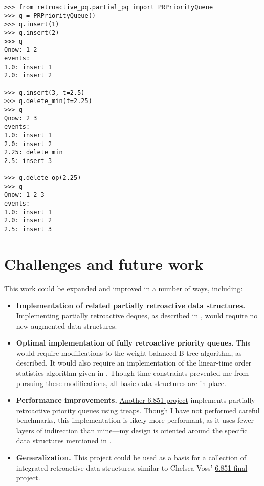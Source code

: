 \documentclass{article}
\begin{document}
\begin{verbatim}
>>> from retroactive_pq.partial_pq import PRPriorityQueue
>>> q = PRPriorityQueue()
>>> q.insert(1)
>>> q.insert(2)
>>> q
Qnow: 1 2
events:
1.0: insert 1
2.0: insert 2

>>> q.insert(3, t=2.5)
>>> q.delete_min(t=2.25)
>>> q
Qnow: 2 3
events:
1.0: insert 1
2.0: insert 2
2.25: delete min
2.5: insert 3

>>> q.delete_op(2.25)
>>> q
Qnow: 1 2 3
events:
1.0: insert 1
2.0: insert 2
2.5: insert 3
\end{verbatim}

\section{Challenges and future work}
This work could be expanded and improved in a number of ways, including:
\begin{itemize}
    \item \textbf{Implementation of related partially retroactive data structures.} Implementing partially retroactive deques, as described in \cite{demaine2007retroactive}, would require no new augmented data structures.
    \item \textbf{Optimal implementation of fully retroactive priority queues.} This would require modifications to the weight-balanced B-tree algorithm, as described. It would also require an implementation of the linear-time order statistics algorithm given in \cite{rauh2010fast}. Though time constraints prevented me from pursuing these modifications, all basic data structures are in place.
    \item \textbf{Performance improvements.} \href{https://github.com/6851-2021/retroactive-priority-queue}{Another 6.851 project} implements partially retroactive priority queues using treaps. Though I have not performed careful benchmarks, this implementation is likely more performant, as it uses fewer layers of indirection than mine---my design is oriented around the specific data structures mentioned in \cite{demaine2015polylogarithmic}.
    \item \textbf{Generalization.} This project could be used as a basis for a collection of integrated retroactive data structures, similar to Chelsea Voss' \href{https://github.com/csvoss/retroactive}{6.851 final project}.
\end{itemize}


\newpage
\printbibliography

\end{document}
